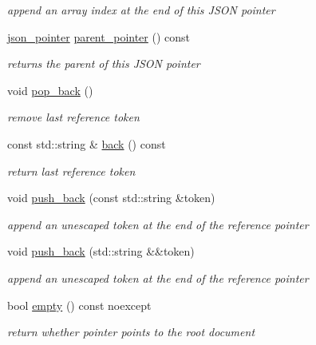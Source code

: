 \begin{DoxyCompactItemize}
\begin{DoxyCompactList}\small\item\em append an array index at the end of this J\+S\+ON pointer \end{DoxyCompactList}\item 
\hyperlink{classnlohmann_1_1json__pointer}{json\+\_\+pointer} \hyperlink{classnlohmann_1_1json__pointer_a6ae0f0aebfa875e3daf0708fcc0f59c9}{parent\+\_\+pointer} () const 
\begin{DoxyCompactList}\small\item\em returns the parent of this J\+S\+ON pointer \end{DoxyCompactList}\item 
void \hyperlink{classnlohmann_1_1json__pointer_a4b1ee4d511ca195bed896a3da47e264c}{pop\+\_\+back} ()
\begin{DoxyCompactList}\small\item\em remove last reference token \end{DoxyCompactList}\item 
const std\+::string \& \hyperlink{classnlohmann_1_1json__pointer_ab5b61d17fe9cee9491ea3203ae5f74b6}{back} () const 
\begin{DoxyCompactList}\small\item\em return last reference token \end{DoxyCompactList}\item 
void \hyperlink{classnlohmann_1_1json__pointer_a697d12b5bd6205f8866691b166b7c7dc}{push\+\_\+back} (const std\+::string \&token)
\begin{DoxyCompactList}\small\item\em append an unescaped token at the end of the reference pointer \end{DoxyCompactList}\item 
void \hyperlink{classnlohmann_1_1json__pointer_ac228b13596d3c34185da9fe61b570194}{push\+\_\+back} (std\+::string \&\&token)
\begin{DoxyCompactList}\small\item\em append an unescaped token at the end of the reference pointer \end{DoxyCompactList}\item 
bool \hyperlink{classnlohmann_1_1json__pointer_a649252bda4a2e75a0915b11a25d8bcc3}{empty} () const noexcept
\begin{DoxyCompactList}\small\item\em return whether pointer points to the root document \end{DoxyCompactList}\end{DoxyCompactItemize}
